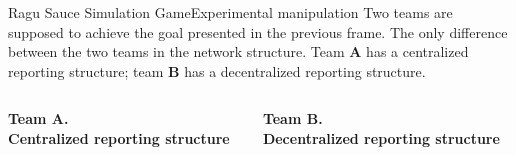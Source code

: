 \documentclass[notes, aspectratio=1610]{beamer}
\begin{document}
\begin{frame}{Ragu Sauce Simulation Game}{Experimental manipulation}
	Two teams are supposed to achieve the goal presented in the previous 
	frame. The only difference between the two teams in the network
	structure. Team \textbf{A} has a centralized reporting structure;
	team \textbf{B} has a decentralized reporting structure.
	\vspace{-1em}
	\begin{columns}[t]
		\begin{column}{0.5\textwidth}
			\begin{center}
			\textbf{Team A.\\Centralized reporting structure}

			

			\end{center}
		\end{column}
		\begin{column}{0.5\textwidth}
			\begin{center}
			\textbf{Team B.\\Decentralized reporting structure}
			
			
			\end{center}
		\end{column}
	\end{columns}
\end{frame}
\end{document}
